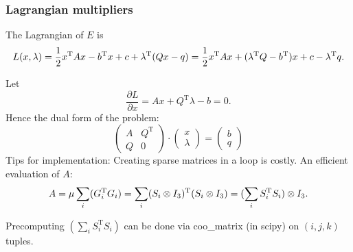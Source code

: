 \documentclass{fancydoc}
\begin{document}
\subsubsection{Lagrangian multipliers}
The Lagrangian of $E$ is
\begin{equation}
 L(x, \lambda) = \frac{1}{2} x^\mathrm{T}Ax - b^\mathrm{T}x + c + \lambda^{\mathrm{T}}(Qx - q) \newline = \frac{1}{2} x^\mathrm{T}Ax + ( \lambda^\mathrm{T} Q -b^\mathrm{T})x + c-\lambda^\mathrm{T}q.
\end{equation}

Let
\begin{equation}
\frac{\partial L}{\partial x} = Ax + Q^{\mathrm{T}}\lambda - b = 0.
\end{equation}
Hence the dual form of the problem:
\begin{equation}
\begin{pmatrix} A&Q^{\mathrm{T}} \\ Q & 0 \end{pmatrix} \cdot \begin{pmatrix} x\\ \lambda \end{pmatrix} = 
\begin{pmatrix} b \\ q \end{pmatrix} 
\end{equation}
Tips for implementation:
Creating sparse matrices in a loop is costly. An efficient evaluation of $A$:
\begin{equation}
 A = \mu \sum_i (G^{\mathrm{T}}_iG_i) \newline = \sum_i (S_i \otimes I_3)^\mathrm{T}(S_i \otimes I_3) \newline = (\sum_i S^\mathrm{T}_i S_i) \otimes I_3.
\end{equation}

Precomputing $(\sum_i S^\mathrm{T}_i S_i)$ can be done via coo\_matrix (in scipy) on $(i,j,k)$ tuples.


 
\end{document}
